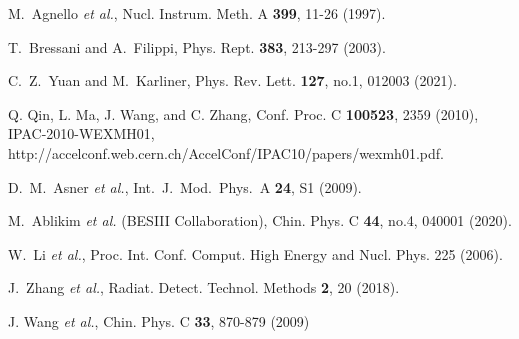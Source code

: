 \documentclass[aps,preprint,showkeys,superscriptaddress]{revtex4}
\begin{document}
\begin{thebibliography}{40}
M.~Agnello %
\textit{et al.},
Nucl. Instrum. Meth. A \textbf{399}, 11-26 (1997).

T.~Bressani and A.~Filippi,
Phys. Rept. \textbf{383}, 213-297 (2003).

C.~Z.~Yuan and M.~Karliner,
Phys. Rev. Lett. \textbf{127}, no.1, 012003 (2021).

 Q. Qin, L. Ma, J. Wang, and C. Zhang,  Conf. Proc. C {\bf 100523}, 2359 (2010), IPAC-2010-WEXMH01, http://accelconf.web.cern.ch/AccelConf/IPAC10/papers/wexmh01.pdf.

D.~M.~Asner {\it et al.}, Int.\ J.\ Mod.\ Phys.\ A {\bf 24}, S1 (2009).

M.~Ablikim \textit{et al.} (BESIII Collaboration),
Chin. Phys. C \textbf{44}, no.4, 040001 (2020).

 W.~Li {\it et al.}, Proc. Int. Conf. Comput. High Energy and Nucl. Phys. 225 (2006).

J.~Zhang  {\it et al.}, Radiat. Detect. Technol. Methods {\bf 2}, 20 (2018).
 
 J. Wang {\it et al.}, Chin. Phys. C {\bf 33}, 870-879 (2009)

\end{thebibliography}
\end{document}
